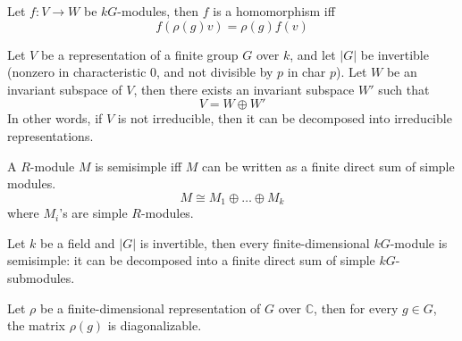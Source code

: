 \documentclass[openany]{book}
\newcommand{\C}{\mathbb{C}}
\begin{document}
\begin{defn}
    Let $f:V\to W$ be $kG$-modules, then $f$ is a homomorphism iff 
    \begin{equation*}
        f(\rho(g)v)=\rho(g)f(v)
    \end{equation*}
\end{defn}

\begin{prop}
    Let $V$ be a representation of a finite group $G$ over $k$, and let $|G|$ be invertible (nonzero in characteristic $0$, and not divisible by $p$ in char $p$). Let $W$ be an invariant subspace of $V$, then there exists an invariant subspace $W'$ such that 
    \begin{equation*}
        V=W\oplus W'
    \end{equation*}
    In other words, if $V$ is not irreducible, then it can be decomposed into irreducible representations.
\end{prop}

\begin{defn}[semisimple]
    A $R$-module $M$ is semisimple iff $M$ can be written as a finite direct sum of simple modules.
    \begin{equation*}
        M\cong M_1\oplus \dots\oplus M_k
    \end{equation*}
    where $M_i$'s are simple $R$-modules.
\end{defn}

\begin{prop}
    Let $k$ be a field and $|G|$ is invertible, then every finite-dimensional $kG$-module is semisimple: it can be decomposed into a finite direct sum of simple $kG$-submodules.
\end{prop}

\begin{prop}
    Let $\rho$ be a finite-dimensional representation of $G$ over $\C$, then for every $g\in G$, the matrix $\rho(g)$ is diagonalizable.
\end{prop}
\end{document}
